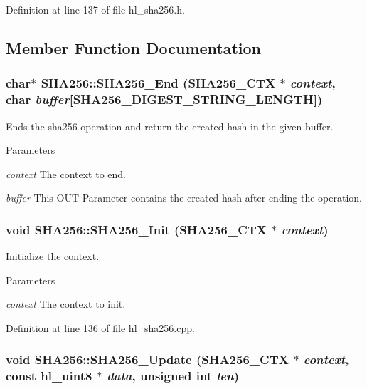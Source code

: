Definition at line 137 of file hl\_\-sha256.h.

\subsection{Member Function Documentation}
\hypertarget{class_s_h_a256_a49aa12cde1048474ded31dd682993b1d}{
\subsubsection[{SHA256\_\-End}]{\setlength{\rightskip}{0pt plus 5cm}char$\ast$ SHA256::SHA256\_\-End ({\bf SHA256\_\-CTX} $\ast$ {\em context}, \/  char {\em buffer}\mbox{[}SHA256\_\-DIGEST\_\-STRING\_\-LENGTH\mbox{]})}}
\label{class_s_h_a256_a49aa12cde1048474ded31dd682993b1d}


Ends the sha256 operation and return the created hash in the given buffer. 
\begin{DoxyParams}{Parameters}
\item[{\em context}]The context to end. \item[{\em buffer}]This OUT-\/Parameter contains the created hash after ending the operation. \end{DoxyParams}
\hypertarget{class_s_h_a256_aeb6ef21e200e3ad135d61a97ffa6fb77}{
\subsubsection[{SHA256\_\-Init}]{\setlength{\rightskip}{0pt plus 5cm}void SHA256::SHA256\_\-Init ({\bf SHA256\_\-CTX} $\ast$ {\em context})}}
\label{class_s_h_a256_aeb6ef21e200e3ad135d61a97ffa6fb77}


Initialize the context. 
\begin{DoxyParams}{Parameters}
\item[{\em context}]The context to init. \end{DoxyParams}


Definition at line 136 of file hl\_\-sha256.cpp.\hypertarget{class_s_h_a256_a8538cc8feb0a8edcfc418492311c4494}{
\subsubsection[{SHA256\_\-Update}]{\setlength{\rightskip}{0pt plus 5cm}void SHA256::SHA256\_\-Update ({\bf SHA256\_\-CTX} $\ast$ {\em context}, \/  const {\bf hl\_\-uint8} $\ast$ {\em data}, \/  unsigned int {\em len})}}
\label{class_s_h_a256_a8538cc8feb0a8edcfc418492311c4494}


